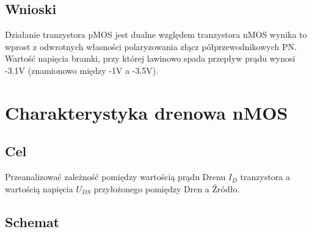 \documentclass[polish,a4paper]{article}
\begin{document}
\subsection{Wnioski}

Działanie tranzystora pMOS jest dualne względem tranzystora nMOS  wynika to wprost z odwrotnych własności polaryzowania złącz
półprzewodnikowych PN. 
Wartość napięcia bramki, przy której lawinowo spada przepływ prądu wynosi  -3.1V (znamionowo między -1V a -3.5V).


\section{Charakterystyka drenowa nMOS}
\subsection{Cel} 
Przeanalizować zależność pomiędzy wartością  prądu  Drenu
$I_{D}$ tranzystora a wartością napięcia  $U_{DS}$ przyłożonego pomiędzy Dren a Źródło. 
\subsection{Schemat}
\end{document}

